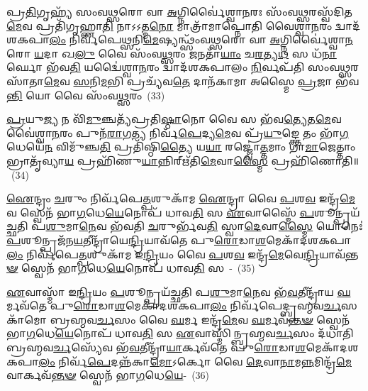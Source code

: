 𑌪𑍍𑌰\-\ul{𑌤𑌿}\-𑌗𑍃𑌹𑍍𑌯᳴ 𑌸𑌂𑌵\-\ul{𑌥𑍍𑌸}\-𑌰𑍋 𑌵𑌾 \ul{𑌅}\-𑌗𑍍𑌨𑌿𑌰𑍍𑌵𑍈॑𑌶𑍍𑌵𑌾\-\ul{𑌨}\-𑌰𑌃 𑌸𑌂᳴𑌵\-\ul{𑌥𑍍𑌸}\-𑌰𑌸𑍍𑌵᳴𑌦𑌿𑌤\-\ul{𑌮𑍇}\-𑌵 𑌪𑍍𑌰𑌤𑌿᳴𑌗𑍃𑌹𑍍𑌣𑌾\-\ul{𑌤𑌿} 𑌨𑌾𑌽𑌽𑌤𑍍𑌮\-\ul{𑌨𑍋} 𑌮𑌾𑌤𑍍𑌰𑌾᳴𑌮𑌾𑌪𑍍𑌨𑍋𑌤𑌿 𑌵𑍈𑌶𑍍𑌵𑌾\-\ul{𑌨}\-𑌰𑌂 𑌦𑍍𑌵𑌾𑌦᳴𑌶\-𑌕𑌪𑌾\-\ul{𑌲𑌂} 𑌨𑌿𑌰𑍍𑌵᳴𑌪𑍇\-\ul{𑌥𑍍𑌸}\-𑌨𑌿\-\ul{𑌮𑍇}\-𑌷𑍍𑌯𑌨𑍍𑌥𑍍𑌸𑌂᳴𑌵\-\ul{𑌥𑍍𑌸}\-𑌰𑍋 𑌵𑌾 \ul{𑌅}\-𑌗𑍍𑌨𑌿𑌰𑍍𑌵𑍈॑𑌶𑍍𑌵𑌾\-\ul{𑌨}\-𑌰𑍋 \ul{𑌯}\-𑌦𑌾 𑌖\-\ul{𑌲𑍁} 𑌵𑍈 𑌸𑌂᳴𑌵\-\ul{𑌥𑍍𑌸}\-𑌰𑌂 \ul{𑌜}\-𑌨𑌤𑌾᳴\-\ul{𑌯𑌾𑌂} 𑌚\-\ul{𑌰}\-𑌤𑍍𑌯\-\ul{𑌥} 𑌸 𑌧᳴\-\ul{𑌨𑌾}\-𑌰𑍍𑌘𑍋 𑌭᳴𑌵\-\ul{𑌤𑌿} 𑌯𑌦𑍍𑌵𑍈॑𑌶𑍍𑌵𑌾\-\ul{𑌨}\-𑌰𑌂 𑌦𑍍𑌵𑌾𑌦᳴𑌶\-𑌕𑌪𑌾𑌲𑌂 \ul{𑌨𑌿}\-𑌰𑍍𑌵𑌪᳴𑌤𑌿 𑌸𑌂𑌵\-\ul{𑌥𑍍𑌸}\-𑌰𑌸𑌾᳴𑌤𑌾\-\ul{𑌮𑍇}\-𑌵 \ul{𑌸}\-𑌨𑌿\-\ul{𑌮}\-𑌭𑌿 𑌪𑍍𑌰𑌚𑍍𑌯᳴𑌵\-\ul{𑌤𑍇} 𑌦𑌾𑌨᳴𑌕𑌾𑌮𑌾 𑌅𑌸𑍍𑌮𑍈 \ul{𑌪𑍍𑌰}\-𑌜𑌾 𑌭᳴𑌵\-\ul{𑌨𑍍𑌤𑌿} 𑌯𑍋 𑌵𑍈 𑌸𑌂᳴𑌵\-\ul{𑌥𑍍𑌸}\-𑌰𑌂~(33)

\-\ul{𑌪𑍍𑌰}\-𑌯𑍁\-\ul{𑌜𑍍𑌯} 𑌨 𑌵𑌿᳴\-\ul{𑌮𑍁}\-𑌞𑍍𑌚𑌤𑍍𑌯᳴𑌪𑍍𑌰𑌤𑌿\-\ul{𑌷𑍍𑌠𑌾}\-𑌨𑍋 𑌵𑍈 𑌸 𑌭᳴𑌵\-\ul{𑌤𑍍𑌯𑍇}\-𑌤\-\ul{𑌮𑍇}\-𑌵 𑌵𑍈॑𑌶𑍍𑌵𑌾\-\ul{𑌨}\-𑌰𑌂 𑌪𑍁𑌨᳴\-\ul{𑌰𑌾}\-𑌗\-\ul{𑌤𑍍𑌯} 𑌨𑌿𑌰𑍍𑌵᳴\-\ul{𑌪𑍇}\-𑌦𑍍𑌯\-\ul{𑌮𑍇}\-𑌵 𑌪𑍍𑌰᳴\-\ul{𑌯𑍁}\-𑌙𑍍𑌕𑍍𑌤𑍇 𑌤𑌂 𑌭𑌾᳴\-\ul{𑌗}\-𑌧𑍇𑌯𑍇᳴\-\ul{𑌨} 𑌵𑌿𑌮𑍁᳴𑌞𑍍𑌚\-\ul{𑌤𑌿} 𑌪𑍍𑌰𑌤𑌿᳴𑌷𑍍𑌠𑌿\-\ul{𑌤𑍍𑌯𑍈} 𑌯\-\ul{𑌯𑌾} 𑌰𑌜𑍍𑌜𑍍𑌵𑍋॑\-\ul{𑌤𑍍𑌤}\-𑌮𑌾𑌂 𑌗𑌾\-\ul{𑌮𑌾}\-𑌜𑍇𑌤𑍍𑌤𑌾𑌂 𑌭𑍍𑌰𑌾𑌤𑍃᳴𑌵𑍍𑌯𑌾\-\ul{𑌯} 𑌪𑍍𑌰𑌹𑌿᳴𑌣𑍁\-\ul{𑌯𑌾}\-𑌨𑍍𑌨𑌿𑌰𑍍\mbox{}𑌋᳴𑌤𑌿\-\ul{𑌮𑍇}\-𑌵𑌾\-\ul{𑌸𑍍𑌮𑍈} 𑌪𑍍𑌰𑌹𑌿᳴𑌣𑍋𑌤𑌿॥~(34)

{\anuvakamend[{\-\ul{𑌨𑌿}\-\-\ul{𑌰𑍍𑌵}\-\-\ul{𑌰𑍁}\-𑌣𑌂 𑌵᳴𑌪𑍇𑌦𑍁\-\ul{𑌭}\-𑌯𑌾\-\ul{𑌦}\-𑌦𑍍𑌯𑍋 𑌵𑍈 𑌸𑌂᳴𑌵\-\ul{𑌥𑍍𑌸}\-𑌰𑍞 𑌷𑌟𑍍𑌤𑍍𑌰𑌿𑍞᳴𑌶𑌚𑍍𑌚।}]}

\-\ul{𑌐}\-𑌨𑍍𑌦𑍍𑌰𑌂 \ul{𑌚}\-𑌰𑍁𑌂 𑌨𑌿𑌰𑍍𑌵᳴𑌪𑍇\-\ul{𑌤𑍍𑌪}\-𑌶𑍁𑌕𑌾᳴𑌮 \ul{𑌐}\-𑌨𑍍𑌦𑍍𑌰𑌾 𑌵𑍈 \ul{𑌪}\-𑌶\-\ul{𑌵} 𑌇𑌨𑍍𑌦𑍍𑌰᳴\-\ul{𑌮𑍇}\-𑌵 𑌸𑍍𑌵𑍇𑌨᳴ 𑌭𑌾\-\ul{𑌗}\-𑌧𑍇\-\ul{𑌯𑍇}\-𑌨𑍋𑌪᳴ 𑌧𑌾𑌵\-\ul{𑌤𑌿} 𑌸 \ul{𑌏}\-𑌵𑌾𑌸𑍍𑌮𑍈᳴ \ul{𑌪}\-𑌶𑍂𑌨𑍍𑌪𑍍𑌰𑌯᳴𑌚𑍍𑌛𑌤𑌿 𑌪\-\ul{𑌶𑍁}\-𑌮𑌾\-\ul{𑌨𑍇}\-𑌵 𑌭᳴𑌵𑌤𑌿 \ul{𑌚}\-𑌰𑍁𑌰𑍍𑌭᳴𑌵\-\ul{𑌤𑌿} 𑌸𑍍𑌵𑌾\-\ul{𑌦𑍇}\-𑌵𑌾\-\ul{𑌸𑍍𑌮𑍈} 𑌯𑍋𑌨𑍇𑌃॑ \ul{𑌪}\-𑌶𑍂𑌨𑍍𑌪𑍍𑌰𑌜᳴𑌨\-\ul{𑌯}\-𑌤𑍀𑌨𑍍𑌦𑍍𑌰𑌾᳴𑌯𑍇\-\ul{𑌨𑍍𑌦𑍍𑌰𑌿}\-𑌯𑌾𑌵᳴𑌤𑍇 𑌪𑍁\-\ul{𑌰𑍋}\-𑌡𑌾\-\ul{𑌶}\-𑌮𑍇𑌕𑌾᳴\-𑌦𑌶\-𑌕𑌪𑌾\-\ul{𑌲𑌂} 𑌨𑌿𑌰𑍍𑌵᳴𑌪𑍇\-\ul{𑌤𑍍𑌪}\-𑌶𑍁𑌕𑌾᳴𑌮 𑌇\-\ul{𑌨𑍍𑌦𑍍𑌰𑌿}\-𑌯𑌂 𑌵𑍈 \ul{𑌪}\-𑌶\-\ul{𑌵} 𑌇𑌨𑍍𑌦𑍍𑌰᳴\-\ul{𑌮𑍇}\-𑌵𑍇\-\ul{𑌨𑍍𑌦𑍍𑌰𑌿}\-𑌯𑌾𑌵᳴\-\ul{𑌨𑍍𑌤}\-\-\ul{𑍟} 𑌸𑍍𑌵𑍇𑌨᳴ 𑌭𑌾\-\ul{𑌗}\-𑌧𑍇\-\ul{𑌯𑍇}\-𑌨𑍋𑌪᳴ 𑌧𑌾𑌵\-\ul{𑌤𑌿} 𑌸~-~(35)

\-\ul{𑌏}\-𑌵𑌾𑌸𑍍𑌮𑌾᳴ 𑌇\-\ul{𑌨𑍍𑌦𑍍𑌰𑌿}\-𑌯𑌂 \ul{𑌪}\-𑌶𑍂𑌨𑍍𑌪𑍍𑌰𑌯᳴𑌚𑍍𑌛𑌤𑌿 𑌪\-\ul{𑌶𑍁}\-𑌮𑌾\-\ul{𑌨𑍇}\-𑌵 𑌭᳴\-\ul{𑌵}\-𑌤𑍀𑌨𑍍𑌦𑍍𑌰𑌾᳴𑌯 \ul{𑌘}\-𑌰𑍍𑌮𑌵᳴𑌤𑍇 𑌪𑍁\-\ul{𑌰𑍋}\-𑌡𑌾\-\ul{𑌶}\-𑌮𑍇𑌕𑌾᳴\-𑌦𑌶\-𑌕𑌪𑌾\-\ul{𑌲𑌂} 𑌨𑌿𑌰𑍍𑌵᳴𑌪𑍇𑌦𑍍𑌬𑍍𑌰𑌹𑍍𑌮𑌵\-\ul{𑌰𑍍𑌚}\-𑌸𑌕𑌾᳴𑌮𑍋 𑌬𑍍𑌰𑌹𑍍𑌮𑌵\-\ul{𑌰𑍍𑌚}\-𑌸𑌂 𑌵𑍈 \ul{𑌘}\-𑌰𑍍𑌮 𑌇𑌨𑍍𑌦𑍍𑌰᳴\-\ul{𑌮𑍇}\-𑌵 \ul{𑌘}\-𑌰𑍍𑌮𑌵᳴\-\ul{𑌨𑍍𑌤}\-\-\ul{𑍟} 𑌸𑍍𑌵𑍇𑌨᳴ 𑌭𑌾\-\ul{𑌗}\-𑌧𑍇\-\ul{𑌯𑍇}\-𑌨𑍋𑌪᳴ 𑌧𑌾𑌵\-\ul{𑌤𑌿} 𑌸 \ul{𑌏}\-𑌵𑌾𑌸𑍍𑌮𑌿᳴𑌨𑍍𑌬𑍍𑌰𑌹𑍍𑌮𑌵\-\ul{𑌰𑍍𑌚}\-𑌸𑌂 𑌦᳴𑌧𑌾𑌤𑌿 𑌬𑍍𑌰𑌹𑍍𑌮𑌵\-\ul{𑌰𑍍𑌚}\-𑌸𑍍𑌯𑍇᳴𑌵 𑌭᳴\-\ul{𑌵}\-𑌤𑍀𑌨𑍍𑌦𑍍𑌰𑌾᳴\-\ul{𑌯𑌾}\-𑌰𑍍𑌕𑌵᳴𑌤𑍇 𑌪𑍁\-\ul{𑌰𑍋}\-𑌡𑌾\-\ul{𑌶}\-𑌮𑍇𑌕𑌾᳴\-𑌦𑌶\-𑌕𑌪𑌾\-\ul{𑌲𑌂} 𑌨𑌿𑌰𑍍𑌵᳴\-\ul{𑌪𑍇}\-𑌦𑌨𑍍𑌨᳴𑌕𑌾\-\ul{𑌮𑍋}\-\-𑌽𑌰𑍍𑌕𑍋 𑌵𑍈 \ul{𑌦𑍇}\-𑌵𑌾\-\ul{𑌨𑌾}\-𑌮\-\ul{𑌨𑍍𑌨}\-𑌮𑌿𑌨𑍍𑌦𑍍𑌰᳴\-\ul{𑌮𑍇}\-𑌵𑌾𑌰𑍍𑌕𑌵᳴\-\ul{𑌨𑍍𑌤}\-\-\ul{𑍟} 𑌸𑍍𑌵𑍇𑌨᳴ 𑌭𑌾\-\ul{𑌗}\-𑌧𑍇\-\ul{𑌯𑍇}\--~(36)

